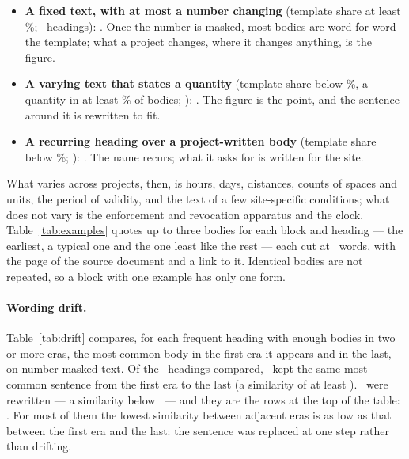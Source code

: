 \documentclass[11pt]{article}
\newcommand{\cctable}[1]{\FloatBarrier\def\cctab{#1}}
\begin{document}
\begin{itemize}
\item \textbf{A fixed text, with at most a number changing} (template share at least
\ccKindBoilerMin\%; \ccKindBoilerN\ headings): \ccKindBoiler. Once the number is masked,
most bodies are word for word the template; what a project changes, where it changes anything,
is the figure.
\item \textbf{A varying text that states a quantity} (template share below
\ccKindBoilerMin\%, a quantity in at least \ccKindNumberMin\% of bodies; \ccKindNumberN):
\ccKindNumber. The figure is the point, and the sentence around it is rewritten to fit.
\item \textbf{A recurring heading over a project-written body} (template share below
\ccKindBespokeMax\%; \ccKindBespokeN): \ccKindBespoke. The name recurs; what it asks for is
written for the site.
\end{itemize}

What varies across projects, then, is hours, days, distances, counts of spaces and units, the
period of validity, and the text of a few site-specific conditions; what does not vary is the
enforcement and revocation apparatus and the clock. Table~\ref{tab:examples} quotes up to three
bodies for each block and heading --- the earliest, a typical one and the one least like the
rest --- each cut at \ccQuoteWords\ words, with the page of the source document and a link to
it. Identical bodies are not repeated, so a block with one example has only one form.

\cctable{headings}
\cctable{examples}

\paragraph{Wording drift.} Table~\ref{tab:drift} compares, for each frequent heading with enough
bodies in two or more eras, the most common body in the first era it appears and in the last,
on number-masked text. Of the \ccDriftN\ headings compared, \ccDriftSame\ kept the same
most common sentence from the first era to the last (a similarity of at least
\ccDriftSameMin).
\ccDriftRewrittenN\ were rewritten --- a similarity below \ccDriftRewriteMax\ --- and they are
the rows at the top of the table: \ccDriftRewritten. For most of them the lowest similarity
between adjacent eras is as low as that between the first era and the last: the sentence was
replaced at one step rather than drifting.

\cctable{drift}
\end{document}
